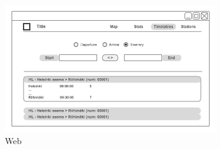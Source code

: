 \begin{figure}[ht]
  \centering
  \begin{subfigure}[b]{0.6\textwidth}
    \includegraphics[width=\textwidth]
      {img/c02-application/png/web-website-timetables.png}
    \caption{Web}
  \end{subfigure}
  ~
  \begin{subfigure}[b]{0.2\textwidth}

\end{subfigure}
\end{figure}
